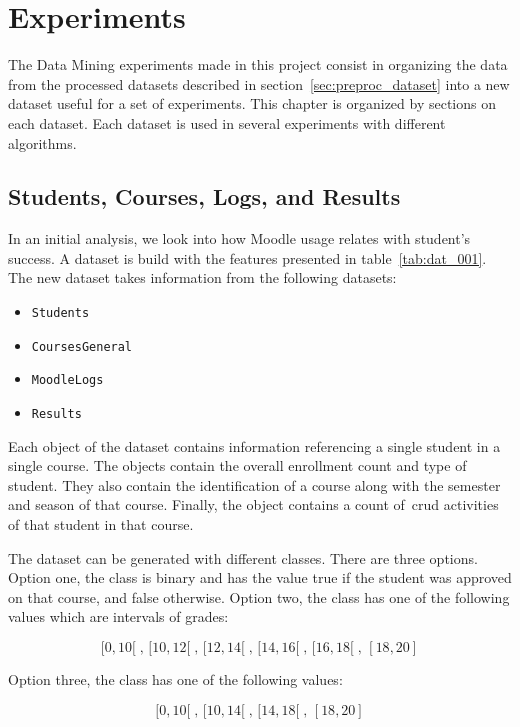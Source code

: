 \chapter{Experiments}
\label{sec:exps}

The Data Mining experiments made in this project consist in organizing the data
from the processed datasets described in section~\ref{sec:preproc_dataset} into
a new dataset useful for a set of experiments. This chapter is organized by
sections on each dataset. Each dataset is used in several experiments with
different algorithms.

\section{Students, Courses, Logs, and Results}
\label{sec:exp_001_002}

In an initial analysis, we look into how Moodle usage relates with student's
success. A dataset is build with the features presented in
table~\ref{tab:dat_001}. The new dataset takes information from the following
datasets:

\begin{itemize}
    \item \texttt{Students}
    \item \texttt{CoursesGeneral}
    \item \texttt{MoodleLogs}
    \item \texttt{Results}
\end{itemize}

Each object of the dataset contains information referencing a single student in
a single course. The objects contain the overall enrollment count and type of
student. They also contain the identification of a course along with the
semester and season of that course. Finally, the object contains a count
of~\gls{crud} activities of that student in that course.

The dataset can be generated with different classes. There are three options.
Option one, the class is binary and has the value true if the student was
approved on that course, and false otherwise. Option two, the class has one of
the following values which are intervals of grades:

\[
    [0, 10[\;,\, [10, 12[\;,\, [12, 14[\;,\, [14, 16[\;,\, [16, 18[\;,\, [18, 20]
\]

Option three, the class has one of the following values:

\[
    [0, 10[\;,\, [10, 14[\;,\, [14, 18[\;,\, [18, 20]
\]

